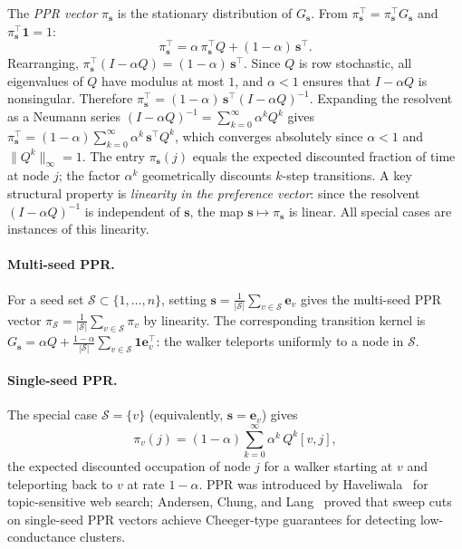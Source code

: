 \documentclass{article}
\theoremstyle{plain}
\theoremstyle{definition}
\def\tp{\intercal}
\newcommand{\arXivtag}[1][]{#1}
\begin{document}
The \emph{\arXivtag[PPR] vector} ${\pi}_{\mathbf{s}}$ is the stationary distribution of $G_{\mathbf{s}}$. From ${\pi}_{\mathbf{s}}^\tp = {\pi}_{\mathbf{s}}^\tp G_{\mathbf{s}}$ and ${\pi}_{\mathbf{s}}^\tp\mathbf{1} = 1$:
\begin{equation}\label{eq:ppr-fixedpoint}
	{\pi}_{\mathbf{s}}^\tp = \alpha\,{\pi}_{\mathbf{s}}^\tp Q + (1-\alpha)\,\mathbf{s}^\tp.
\end{equation}
Rearranging, ${\pi}_{\mathbf{s}}^\tp(I - \alpha Q) = (1-\alpha)\,\mathbf{s}^\tp$. Since $Q$ is row stochastic, all eigenvalues of $Q$ have modulus at most $1$, and $\alpha < 1$ ensures that $I - \alpha Q$ is nonsingular. Therefore
${\pi}_{\mathbf{s}}^\tp = (1-\alpha)\,\mathbf{s}^\tp(I - \alpha Q)^{-1}$.
Expanding the resolvent as a Neumann series $(I - \alpha Q)^{-1} = \sum_{k=0}^\infty \alpha^k Q^k$ gives
${\pi}_{\mathbf{s}}^\tp = (1-\alpha)\sum_{k=0}^\infty \alpha^k\, \mathbf{s}^\tp Q^k$,
which converges absolutely since $\alpha < 1$ and $\|Q^k\|_\infty = 1$. The entry $\pi_{\mathbf{s}}(j)$ equals the expected discounted fraction of time at node $j$; the factor $\alpha^k$ geometrically discounts $k$-step transitions. \arXivtag
A key structural property is \emph{linearity in the preference vector}: since the resolvent $(I - \alpha Q)^{-1}$ is independent of $\mathbf{s}$, the map $\mathbf{s} \mapsto {\pi}_{\mathbf{s}}$ is linear. All special cases are instances of this linearity.

\paragraph{Multi-seed PPR.}
For a seed set $\mathcal{S} \subset \{1,\ldots,n\}$, setting $\mathbf{s} = \frac{1}{|\mathcal{S}|}\sum_{v \in \mathcal{S}}\mathbf{e}_v$ gives the multi-seed PPR vector ${\pi}_{\mathcal{S}} = \frac{1}{|\mathcal{S}|}\sum_{v \in \mathcal{S}} {\pi}_v$ by linearity. The corresponding transition kernel is $G_{\mathbf{s}} = \alpha Q + \frac{1-\alpha}{|\mathcal{S}|}\sum_{v \in \mathcal{S}}\mathbf{1}\mathbf{e}_v^\tp$: the walker teleports uniformly to a node in $\mathcal{S}$.

\paragraph{Single-seed PPR.}
The special case $\mathcal{S} = \{v\}$ (equivalently, $\mathbf{s} = \mathbf{e}_v$) gives
\begin{equation}\label{eq:ppr-singleseed}
	\pi_v(j) = (1-\alpha)\sum_{k=0}^\infty \alpha^k\, Q^k[v,j],
\end{equation}
the expected discounted occupation of node $j$ for a walker starting at $v$ and teleporting back to $v$ at rate $1-\alpha$. PPR was introduced by Haveliwala~\cite{haveliwala2003topic} for topic-sensitive web search; Andersen, Chung, and Lang~\cite{andersen2006local} proved that sweep cuts on single-seed PPR vectors achieve Cheeger-type guarantees for detecting low-conductance clusters.
\end{document}
